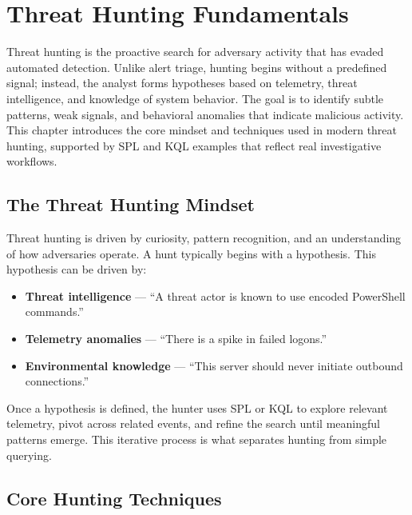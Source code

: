 \section{Threat Hunting Fundamentals}

Threat hunting is the proactive search for adversary activity that has evaded automated detection. 
Unlike alert triage, hunting begins without a predefined signal; instead, the analyst forms hypotheses 
based on telemetry, threat intelligence, and knowledge of system behavior. The goal is to identify subtle 
patterns, weak signals, and behavioral anomalies that indicate malicious activity. This chapter introduces 
the core mindset and techniques used in modern threat hunting, supported by SPL and KQL examples that reflect 
real investigative workflows.


\subsection*{The Threat Hunting Mindset}

Threat hunting is driven by curiosity, pattern recognition, and an understanding of how adversaries operate. 
A hunt typically begins with a hypothesis. This hypothesis can be driven by:

\begin{itemize}
    \item \textbf{Threat intelligence} — “A threat actor is known to use encoded PowerShell commands.”
    \item \textbf{Telemetry anomalies} — “There is a spike in failed logons.”
    \item \textbf{Environmental knowledge} — “This server should never initiate outbound connections.”
\end{itemize}

Once a hypothesis is defined, the hunter uses SPL or KQL to explore relevant telemetry, pivot across related 
events, and refine the search until meaningful patterns emerge. This iterative process is what separates hunting 
from simple querying.


\subsection*{Core Hunting Techniques}

